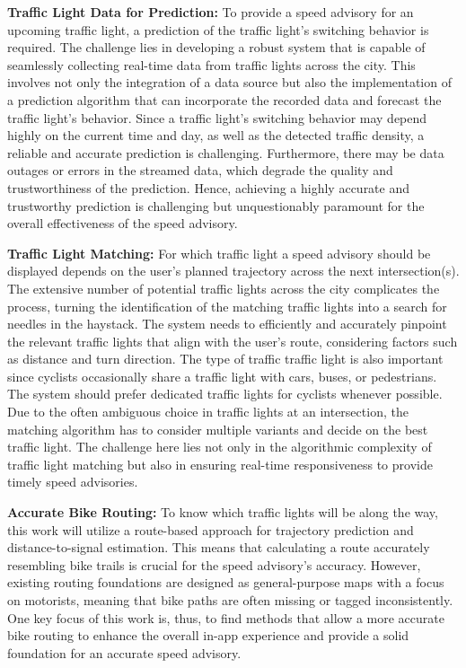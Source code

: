 \textbf{\color{cidarkblue}Traffic Light Data for Prediction:} To provide a speed advisory for an upcoming traffic light, a prediction of the traffic light's switching behavior is required. The challenge lies in developing a robust system that is capable of seamlessly collecting real-time data from traffic lights across the city. This involves not only the integration of a data source but also the implementation of a prediction algorithm that can incorporate the recorded data and forecast the traffic light's behavior. Since a traffic light's switching behavior may depend highly on the current time and day, as well as the detected traffic density, a reliable and accurate prediction is challenging. Furthermore, there may be data outages or errors in the streamed data, which degrade the quality and trustworthiness of the prediction. Hence, achieving a highly accurate and trustworthy prediction is challenging but unquestionably paramount for the overall effectiveness of the speed advisory.

\textbf{\color{cidarkblue}Traffic Light Matching:} For which traffic light a speed advisory should be displayed depends on the user's planned trajectory across the next intersection(s). The extensive number of potential traffic lights across the city complicates the process, turning the identification of the matching traffic lights into a search for needles in the haystack. The system needs to efficiently and accurately pinpoint the relevant traffic lights that align with the user's route, considering factors such as distance and turn direction. The type of traffic traffic light is also important since cyclists occasionally share a traffic light with cars, buses, or pedestrians. The system should prefer dedicated traffic lights for cyclists whenever possible. Due to the often ambiguous choice in traffic lights at an intersection, the matching algorithm has to consider multiple variants and decide on the best traffic light. The challenge here lies not only in the algorithmic complexity of traffic light matching but also in ensuring real-time responsiveness to provide timely speed advisories.

\textbf{\color{cidarkblue}Accurate Bike Routing:} To know which traffic lights will be along the way, this work will utilize a route-based approach for trajectory prediction and distance-to-signal estimation. This means that calculating a route accurately resembling bike trails is crucial for the speed advisory's accuracy. However, existing routing foundations are designed as general-purpose maps with a focus on motorists, meaning that bike paths are often missing or tagged inconsistently. One key focus of this work is, thus, to find methods that allow a more accurate bike routing to enhance the overall in-app experience and provide a solid foundation for an accurate speed advisory.

